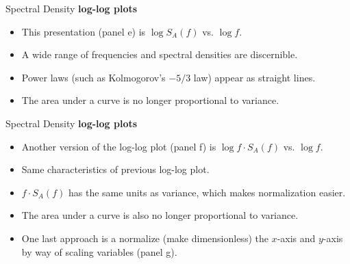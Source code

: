 \begin{frame}{Spectral Density}
\textbf{log-log plots}
\begin{itemize}
	\item This presentation (panel e) is $\log{S_A(f)}$ vs. $\log{f}$.
	\item A wide range of frequencies and spectral densities are discernible.
	\item Power laws (such as Kolmogorov's $-5/3$ law) appear as straight lines.
	\item The area under a curve is no longer proportional to variance.
\end{itemize}
\end{frame}
\begin{frame}{Spectral Density}
\textbf{log-log plots}
\begin{itemize}
	\item Another version of the log-log plot (panel f) is $\log{f \cdot S_A(f)}$ vs. $\log{f}$.
	\item Same characteristics of previous log-log plot.
	\item $f \cdot S_A(f)$ has the same units as variance, which makes normalization easier.
	\item The area under a curve is also no longer proportional to variance. 
	\item One last approach is a normalize (make dimensionless) the $x$-axis and $y$-axis by way of scaling variables (panel g).
\end{itemize}
\end{frame}


